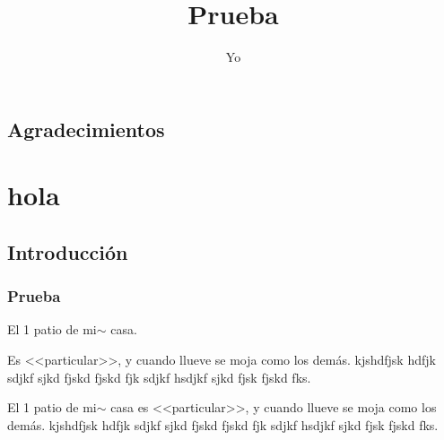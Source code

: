 \documentclass[a4paper,11pt]{memoir}
\title{Prueba}
\author{Yo}
\begin{document}
\frontmatter

\tableofcontents

\chapter{Agradecimientos}

\mainmatter

\part{hola}

\chapter{Introducción}

\section{Prueba}

El 1 patio  de mi$\sim$ casa.

Es <<particular>>, y cuando llueve se moja como los demás. kjshdfjsk hdfjk \thefigure{} sdjkf sjkd fjskd fjskd fjk sdjkf hsdjkf sjkd fjsk fjskd fks.

El 1 patio de mi$\sim$ casa es <<particular>>, y cuando llueve se moja como los demás. kjshdfjsk hdfjk \thefigure{} sdjkf sjkd fjskd fjskd fjk sdjkf hsdjkf sjkd fjsk fjskd fks.
\end{document}
